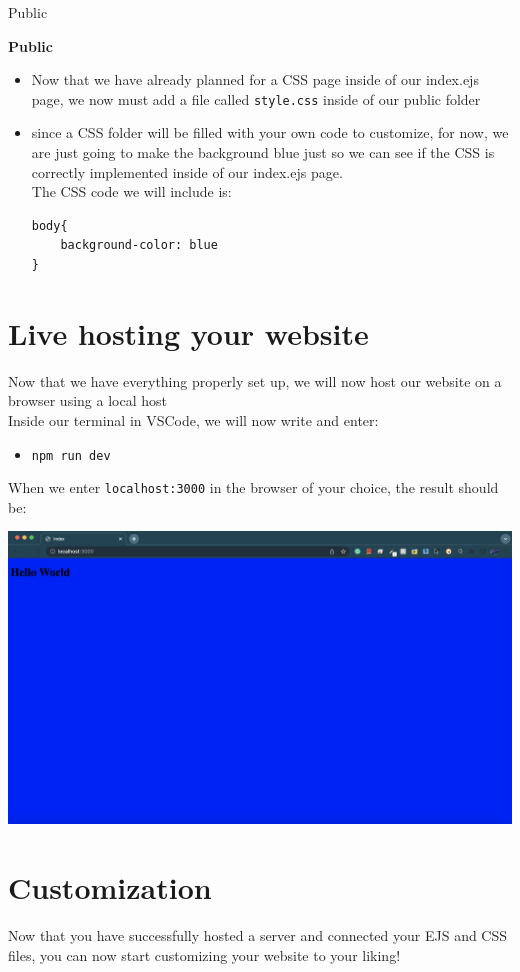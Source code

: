 \documentclass[a4paper,12pt]{article}
\begin{document}
\begin{exe}
\ex \label{ex:app}
\gll Public\\ 

\begin{large} \pagebreak\textbf{Public}\end{large}
\begin{itemize}
\item Now that we have already planned for a CSS page inside of our index.ejs page, we now must add a file called \verb|style.css| inside of our public folder
\item since a CSS folder will be filled with your own code to customize, for now, we are just going to make the background blue just so we can see if the CSS is correctly implemented inside of our index.ejs page.\\

The CSS code we will include is:
\begin{verbatim}
body{
    background-color: blue
}
\end{verbatim}
\end{itemize}
 
\end{exe}


\section{Live hosting your website}
Now that we have everything properly set up, we will now host our website on a browser using a local host\\
Inside our terminal in VSCode, we will now write and enter:
\begin{itemize}
    \item \verb|npm run dev|
\end{itemize}

\begin{center}
When we enter \verb|localhost:3000| in the browser of your choice, the result should be:
\end{center}

\includegraphics[scale=.3]{localhost.png} 


\section{Customization}

Now that you have successfully hosted a server and connected your EJS and CSS files, you can now start customizing your website to your liking! 
\end{document}
